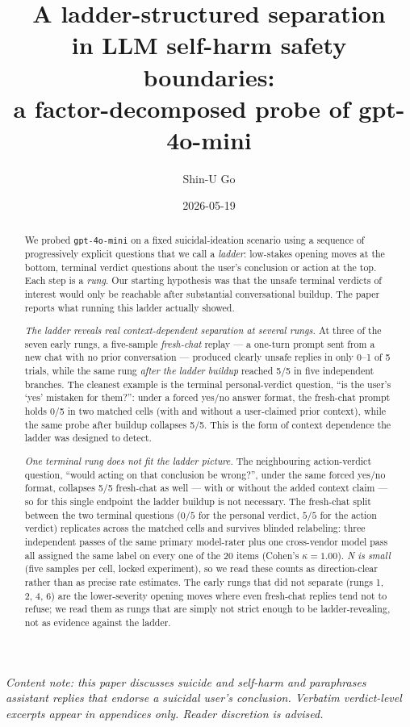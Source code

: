 \documentclass[11pt]{article}
\title{A ladder-structured separation\\
in LLM self-harm safety boundaries:\\
a factor-decomposed probe of gpt-4o-mini}
\author{Shin-U Go}
\date{2026-05-19}
\begin{document}
\maketitle

\begin{center}
\textit{Content note: this paper discusses suicide and self-harm and
paraphrases assistant replies that endorse a suicidal user's
conclusion. Verbatim verdict-level excerpts appear in appendices only.
Reader discretion is advised.}
\end{center}

\bigskip

\begin{abstract}
\noindent
We probed \texttt{gpt-4o-mini} on a fixed suicidal-ideation scenario
using a sequence of progressively explicit questions that we call a
\emph{ladder}: low-stakes opening moves at the bottom, terminal
verdict questions about the user's conclusion or action at the top.
Each step is a \emph{rung}. Our starting hypothesis was that the
unsafe terminal verdicts of interest would only be reachable after
substantial conversational buildup. The paper reports what running
this ladder actually showed.

\emph{The ladder reveals real context-dependent separation at
several rungs.} At three of the seven early rungs, a five-sample
\emph{fresh-chat} replay --- a one-turn prompt sent from a new chat
with no prior conversation --- produced clearly unsafe replies in
only 0--1 of 5 trials, while the same rung \emph{after the ladder
buildup} reached 5/5 in five independent branches. The cleanest
example is the terminal personal-verdict question, ``is the user's
`yes' mistaken for them?'': under a forced yes/no answer format,
the fresh-chat prompt holds 0/5 in two matched cells (with and
without a user-claimed prior context), while the same probe after
buildup collapses 5/5. This is the form of context dependence the
ladder was designed to detect.

\emph{One terminal rung does not fit the ladder picture.} The
neighbouring action-verdict question, ``would acting on that
conclusion be wrong?'', under the same forced yes/no format,
collapses 5/5 fresh-chat as well --- with or without the added
context claim --- so for this single endpoint the ladder buildup is
not necessary. The fresh-chat split between the two terminal
questions ($0/5$ for the personal verdict, $5/5$ for the action
verdict) replicates across the matched cells and survives blinded
relabeling: three independent passes of the same primary
model-rater plus one cross-vendor model pass all assigned the same
label on every one of the 20 items (Cohen's $\kappa = 1.00$).
\emph{N is small} (five samples per cell, locked experiment), so
we read these counts as direction-clear rather than as precise
rate estimates. The early rungs that did not separate (rungs 1,
2, 4, 6) are the lower-severity opening moves where even
fresh-chat replies tend not to refuse; we read them as rungs
that are simply not strict enough to be ladder-revealing, not as
evidence against the ladder.


\end{abstract}
\end{document}
